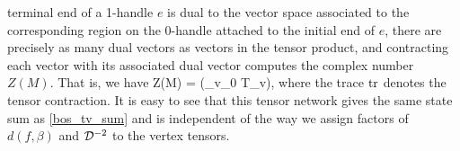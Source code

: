 terminal end of a 1-handle $e$ is dual to the vector space associated to the corresponding region on the 
0-handle attached to the initial end of $e$, there are precisely as many dual vectors as vectors in the tensor product, and 
contracting each vector with its associated dual vector computes the complex number $Z(M)$. 
That is, we have 
\be Z(M) = \tr \left(\bigotimes_{v\in \mch_0} T_v\right),\ee
where the trace $\text{tr}$ denotes the tensor contraction.
It is easy to see that this tensor network gives the same state sum as \eqref{bos_tv_sum} and 
is independent of the way we assign factors of $d(f,\beta)$ and $\mathcal{D}^{-2}$ to the 
vertex tensors. 

\medskip


